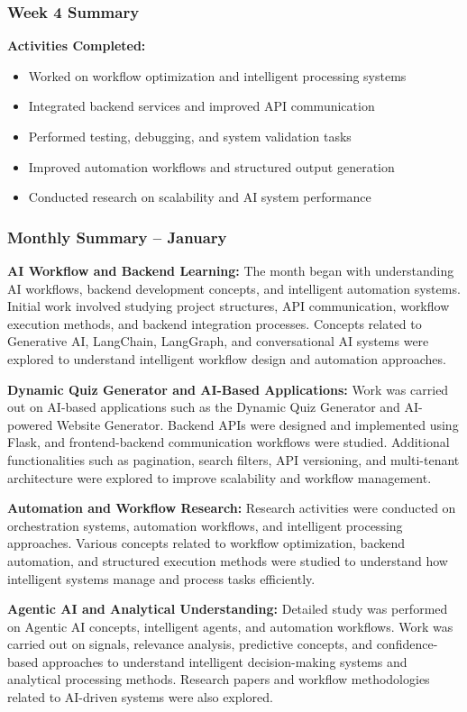 \documentclass[12pt,a4paper]{report}
\begin{document}
\subsubsection*{Week 4 Summary}
\textbf{Activities Completed:}
\begin{itemize}[leftmargin=1.5cm]
    \item Worked on workflow optimization and intelligent processing systems
    \item Integrated backend services and improved API communication
    \item Performed testing, debugging, and system validation tasks
    \item Improved automation workflows and structured output generation
    \item Conducted research on scalability and AI system performance
\end{itemize}

\subsubsection*{Monthly Summary -- January}
\textbf{AI Workflow and Backend Learning:}
The month began with understanding AI workflows, backend development concepts, and intelligent automation systems. Initial work involved studying project structures, API communication, workflow execution methods, and backend integration processes. Concepts related to Generative AI, LangChain, LangGraph, and conversational AI systems were explored to understand intelligent workflow design and automation approaches.

\textbf{Dynamic Quiz Generator and AI-Based Applications:}
Work was carried out on AI-based applications such as the Dynamic Quiz Generator and AI-powered Website Generator. Backend APIs were designed and implemented using Flask, and frontend-backend communication workflows were studied. Additional functionalities such as pagination, search filters, API versioning, and multi-tenant architecture were explored to improve scalability and workflow management.

\textbf{Automation and Workflow Research:}
Research activities were conducted on orchestration systems, automation workflows, and intelligent processing approaches. Various concepts related to workflow optimization, backend automation, and structured execution methods were studied to understand how intelligent systems manage and process tasks efficiently.

\textbf{Agentic AI and Analytical Understanding:}
Detailed study was performed on Agentic AI concepts, intelligent agents, and automation workflows. Work was carried out on signals, relevance analysis, predictive concepts, and confidence-based approaches to understand intelligent decision-making systems and analytical processing methods. Research papers and workflow methodologies related to AI-driven systems were also explored.
\end{document}
